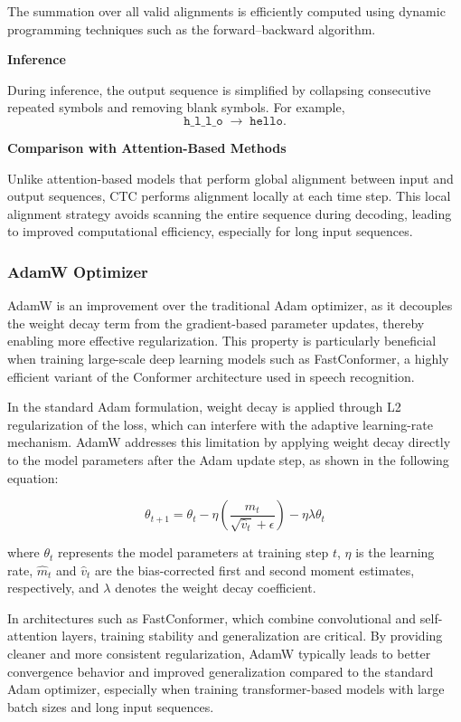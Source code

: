 The summation over all valid alignments is efficiently computed using dynamic
programming techniques such as the forward--backward algorithm.

\textbf{Inference}

During inference, the output sequence is simplified by collapsing consecutive
repeated symbols and removing blank symbols. For example,
\begin{equation}
	\texttt{h\_l\_l\_o} \;\longrightarrow\; \texttt{hello}.
\end{equation}

\textbf{Comparison with Attention-Based Methods}

Unlike attention-based models that perform global alignment between input and output
sequences, CTC performs alignment locally at each time step. This local alignment
strategy avoids scanning the entire sequence during decoding, leading to improved
computational efficiency, especially for long input sequences.

\subsubsection{AdamW Optimizer}
AdamW is an improvement over the traditional Adam optimizer, as it decouples the
weight decay term from the gradient-based parameter updates, thereby enabling more
effective regularization. This property is particularly beneficial when training
large-scale deep learning models such as FastConformer, a highly efficient variant
of the Conformer architecture used in speech recognition.

In the standard Adam formulation, weight decay is applied through L2 regularization
of the loss, which can interfere with the adaptive learning-rate mechanism. AdamW
addresses this limitation by applying weight decay directly to the model parameters
after the Adam update step, as shown in the following equation:

\begin{equation}
	\theta_{t+1} = \theta_t
	- \eta \left( \frac{\hat{m}_t}{\sqrt{\hat{v}_t} + \epsilon} \right)
	- \eta \lambda \theta_t
\end{equation}

where \( \theta_t \) represents the model parameters at training step \( t \),
\( \eta \) is the learning rate, \( \hat{m}_t \) and \( \hat{v}_t \) are the
bias-corrected first and second moment estimates, respectively, and \( \lambda \)
denotes the weight decay coefficient.

In architectures such as FastConformer, which combine convolutional and
self-attention layers, training stability and generalization are critical. By
providing cleaner and more consistent regularization, AdamW typically leads to
better convergence behavior and improved generalization compared to the standard
Adam optimizer, especially when training transformer-based models with large batch
sizes and long input sequences.

